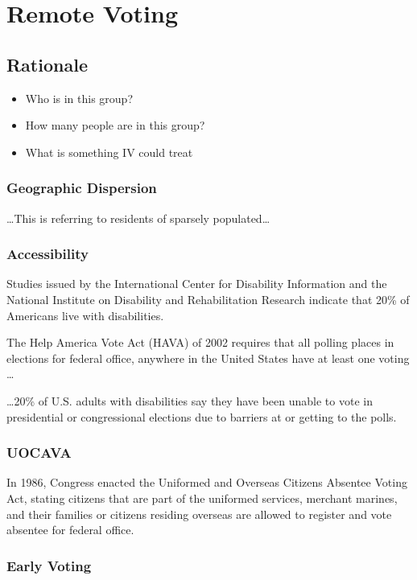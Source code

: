 \chapter{Remote Voting}
\label{chapter:remote_voting}

\section{Rationale}

\begin{itemize}
\item Who is in this group?
\item How many people are in this group?
\item What is something IV could treat
\end{itemize}

\subsection{Geographic Dispersion}
\ldots This is referring to residents of sparsely populated\ldots

\subsection{Accessibility}
Studies issued by the International Center for Disability Information and the National Institute on Disability and Rehabilitation Research indicate that 20\% of Americans live with disabilities.

The Help America Vote Act (HAVA) of 2002 requires that all polling places in elections for federal office, anywhere in the United States have at least one voting \ldots

\ldots 20\% of U.S. adults with disabilities say they have been unable to vote in presidential or congressional elections due to barriers at or getting to the polls.

\subsection{UOCAVA}
In 1986, Congress enacted the Uniformed and Overseas Citizens Absentee Voting Act, stating citizens that are part of the uniformed services, merchant marines, and their families or citizens residing overseas are allowed to register and vote absentee for federal office.

\subsection{Early Voting}

